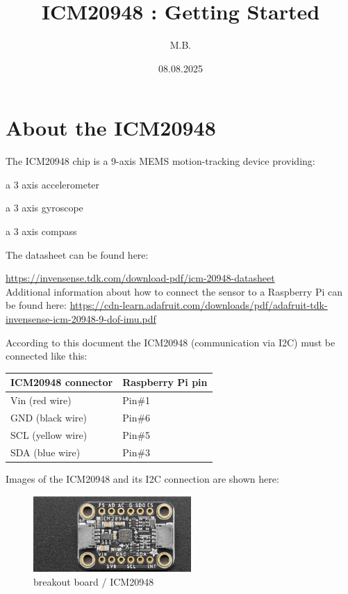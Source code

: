 \documentclass[paper=a4, oneside, fontsize=11pt,
parskip=full]{scrartcl}
\title{ICM20948 : Getting Started}
\author{M.B.}
\date{08.08.2025}
\newcommand{\head}[1]{\textbf{#1}}
\begin{document}
\noindent
\maketitle
\tableofcontents
	
\section{About the ICM20948}	

The ICM20948 chip is a 9-axis MEMS motion-tracking device providing:

\begin{compactitem}
	\item a 3 axis accelerometer
	\item a 3 axis gyroscope
	\item a 3 axis compass
\end{compactitem}



The datasheet can be found here:

\url{https://invensense.tdk.com/download-pdf/icm-20948-datasheet} \\

Additional information about how to connect the sensor to a Raspberry Pi can be found here: \url{https://cdn-learn.adafruit.com/downloads/pdf/adafruit-tdk-invensense-icm-20948-9-dof-imu.pdf}

According to this document the ICM20948 (communication via I2C) must be connected like this:

\begin{table}[h]
	\centering
	\begin{tabular}{ll}
		\head{ICM20948 connector} & \head{Raspberry Pi pin} \\
		\hline
		Vin (red wire) & Pin\#1 \\
		GND (black wire) & Pin\#6 \\
		SCL (yellow wire) & Pin\#5 \\
		SDA (blue wire) & Pin\#3 \\
		\hline
	\end{tabular}

\end{table}

Images of the ICM20948 and its I2C connection are shown here:

\begin{figure}[h]
	\centering
	\includegraphics[width=6cm]{images/ICM20948.png}
	\caption{breakout board / ICM20948}
\end{figure}	
\end{document}
